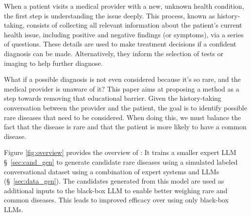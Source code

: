 

When a patient visits a medical provider with a new, unknown health condition, the first step is understanding the issue deeply. This process, known as history-taking, consists of collecting all relevant information about the patient's current health issue, including positive and negative findings (or symptoms), via a series of questions. These details are used to make treatment decisions if a confident diagnosis can be made. Alternatively, they inform the selection of tests or imaging to help further diagnose. 

What if a possible diagnosis is not even considered because it's so rare, and the medical provider is unaware of it? 
This paper aims at proposing a method \methodname as a step towards removing that educational barrier. Given the history-taking conversation between the provider and the patient, the goal is to identify possible rare diseases that need to be considered.  When doing this, we must balance the fact that the disease is rare and that the patient is more likely to have a common disease.


  Figure \ref{fig:overview} provides the overview of \methodname: It trains a smaller expert LLM \S~\ref{sec:cand_gen} to generate candidate rare diseases using a simulated labeled conversational dataset using a combination of expert systems and LLMs (\S~\ref{sec:data_gen}). The candidates generated from this model are used as additional inputs to the black-box LLM to enable better weighing rare and common diseases. This leads to improved efficacy over using only black-box LLMs.
